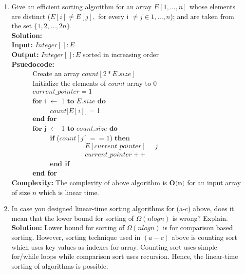 \documentclass[12pt]{article}
\begin{document}
\begin{enumerate}
\begin{enumerate}
\item Give an efficient sorting algorithm for an array $E[1,...,n]$ whose elements are distinct ($E[i] \ne E[j], $ for every i $\ne j \in {1,...,n}$); and are taken from the set $\{1, 2, ..., 2n\}.$\\
\textbf{Solution:} \\
\textbf{Input:} $Integer[]: E$ \\ 
\textbf{Output:} $Integer[]: E$ sorted in increasing order \\
\textbf{Psuedocode:}\\
\verb|		|Create an array $count[2*E.size]$\\
\verb|		|Initialize the elements of $count$ array to 0\\
\verb|		|$current\_pointer = 1$\\
\verb|		|$\textbf{for}$ i $\leftarrow$ 1 $\textbf{to}$ $E.size$ $\textbf{do}$ \\
\verb|		|\verb|		|$count[E[i]$] = 1 \\
\verb|		|$\textbf{end for}$\\
\verb|		|$\textbf{for}$ j $\leftarrow$ 1 $\textbf{to}$ $count.size$ $\textbf{do}$\\
\verb|		|\verb|		|$\textbf{if} $ ($count[j] == 1$) $\textbf{then}$\\
\verb|		|\verb|		|\verb|		|\verb|		|$E[current\_pointer] = j$\\
\verb|		|\verb|		|\verb|		|\verb|		|$current\_pointer++$\\
\verb|		|\verb|		|\textbf{end if}\\
\verb|		|\textbf{end for}\\
\textbf{Complexity:} The complexity of above algorithm is $\textbf{O(n)}$ for an input array of size $n$ which is linear time.


\item In case you designed linear-time sorting algorithms for (a-c) above, does it mean that the lower bound for sorting of $\Omega(n log n)$ is wrong? Explain.\\
\textbf{Solution:} Lower bound for sorting of $\Omega(n log n)$ is for comparison based sorting. However, sorting technique used in $(a-c)$ above is counting sort which uses key values as indexes for array. Counting sort uses simple for/while loops while comparison sort uses recursion. Hence, the linear-time sorting of algorithms is possible.\\

\end{enumerate}


\end{enumerate}
\end{document}
